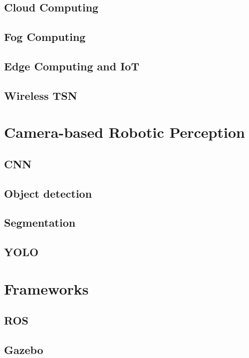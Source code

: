\subsection{Cloud Computing}
\subsection{Fog Computing}
\subsection{Edge Computing and IoT}
\subsection{Wireless TSN}

\section{Camera-based Robotic Perception}\label{sec:background:robotic_perception}
\subsection{CNN}
\subsection{Object detection}
\subsection{Segmentation}
\subsection{YOLO}

\section{Frameworks}\label{sec:background:frameworks}
\subsection{ROS}


\subsection{Gazebo}
